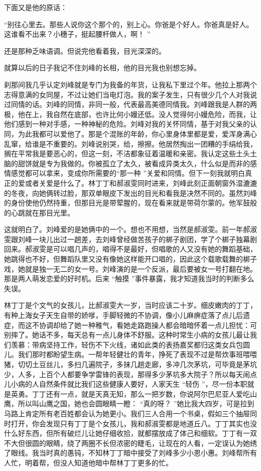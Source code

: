 \documentclass[12pt,twoside,openany]{book}
\begin{document}
下面又是他的原话：

“别往心里去。那些人说你这个那个的，别上心。你爸是个好人。你爸真是好人。这谁看不出来？小穗子，挺起腰杆做人，啊！ ”

还是那种乏味语调。但说完他看着我，目光深深的。

就算以后的日子我记不住刘峰的长相，他的目光我也别想忘掉。

刹那间我几乎认定刘峰就是专门为我备的年货，让我私下里过个年。他拉上那两个志得意满的女同屋，不过让她们当电灯泡。我的案子发生，只有很少几个人对我说过同情的话。刘峰的同情，非同一般，代表最高美德同情我。刘峰跟我是人群的两极，他在上，我自然在底部，也许比何小嫚还低。没人觉得何小嫚危险，而我，让他们感到一种对手感，一种神秘的危险。刘峰对我的关怀同情，基于对我父亲的认同，为此我都可以爱他了。那是个混账的年龄，你心里身体里都是爱，爱浑身满心乱窜，给谁是不重要的。刘峰说别哭，给，擦擦。他居然掏出一团糟的手绢给我，搁在平常我是要恶心的，但这一刻，不洁都象征着温暖和亲密。我认定这些土头土脑的甜饼就是专为我做的。你被孤立了太久，被看成异类太久，什么似是而非的感情感觉都可以拿来，变成你所需要的“那一种 ”关爱和同情。但下一刻我就明白真正的爱或者关爱是什么了。林丁丁和郝淑雯同时进来，刘峰此刻正面朝窗外湿漉漉的冬夜，向她俩转过脸，那双单眼皮下发出的目光和看我是决然不同的。虽然刘峰的身份使他仍然持重，但那目光是带荤腥的，现在看来就是带荷尔蒙的。他军鼓般的心跳就在那目光里。

这就明白了。刘峰爱的是她俩中的一个。想也不用想，当然是郝淑雯。前一年郝淑雯跟刘峰一块儿出过一趟差，去刘峰曾经做苦孩子的梆子剧团，学了个梆子独幕剧回来。郝淑雯是可以唱几声的，唱得不是最好，但唱歌的人又没有她的舞蹈基础，她跳得也不好，但舞蹈队里又没有像她这样能开口唱的，因此这个载歌载舞的梆子戏，她就是独一无二的女一号。刘峰演的是一个反派，最后要被女一号打翻在地。那是两人萌发恋爱的好时机。后来 “触摸 ”事件暴露，我才知道我当时的判断多么失误。

林丁丁是个文气的女孩儿，比郝淑雯大一岁，当时应该二十岁。细皮嫩肉的丁丁，有种上海女子天生自带的娇嗲，手脚轻微的不协调，像小儿麻痹症落了点儿后遗症，而这不协调却给了她一种稚气，看她走路跑操人都会暗暗怀着一点儿担忧：可别摔了。她话不多，每天总有一点儿身体不舒服。这种时常生小病的女孩儿最让我们羡慕：带病坚持工作，轻伤不下火线，诸如此类的表扬嘉奖都归这类女兵包圆儿。我们那时都盼望生病。一帮年轻健壮的青年，挣死了表现不过是帮炊事班喂喂猪，切切土豆丝儿，多扫几遍院子，多抹几趟走廊，多冲几次茅坑，可毕竟是茅坑少，人多，上百个人都要争学雷锋的表现，那得多少茅坑多大院子？所以每天闹点儿小病的人自然条件就比我们这些健康人要好，人家天生 “轻伤 ”，尽一份本职就是英勇。丁丁还有一点，就是天真无知，那么一把岁数，你说阿尔巴尼亚人爱吃山鹰，所以叫山鹰之国，她也会圆眼睛一瞪： “真的呀？ ”她比我大四岁，可是拉到马路上肯定所有老百姓都会认为她更小。我们三人合用一个书桌，假如三个抽屉同时打开，你会发现只有丁丁是个女孩儿，我和郝淑雯都是地道丘八。丁丁其实也没什么好东西，但所有破烂儿让她仔细收拾，就都摆放成了体己和细软。丁丁有一双不大但很圆的眼睛，绕了两圈不长但浓密的睫毛，让现在的人看，一定误认为她绣了眼线。我当时真的愚钝，不知林丁丁暗中接受了刘峰多少小恩小惠。刘峰帮所有人忙，明着帮，但没人知道他暗中帮林丁丁更多的忙。
\end{document}
